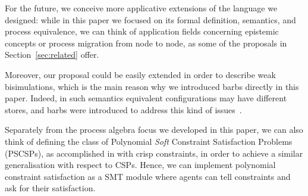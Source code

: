 \documentclass{llncs}
\begin{document}
For the future, we conceive more applicative extensions of the language we designed: while in this paper we focused on its formal definition, semantics, and process equivalence, we can think of application fields concerning epistemic concepts or process migration from node to node, as some of the proposals in Section~\ref{sec:related} offer.

Moreover, our proposal could be easily extended in order to describe weak bisimulations, which is the main reason why we introduced barbs directly in this paper. 
Indeed, in such semantics equivalent configurations may have different stores, and barbs were introduced to address this kind of issues~\cite{barbed}.

Separately from the process algebra focus we developed in this paper, we can also think of defining the class of Polynomial \emph{Soft} Constraint Satisfaction Problems (PSCSPs), 
as accomplished in \cite{pcsp09} with crisp constraints, in order to achieve a similar generalisation with respect to CSPs. Hence, we can implement polynomial constraint satisfaction as a SMT module where agents can tell constraints and ask for their satisfaction.






\end{document}
